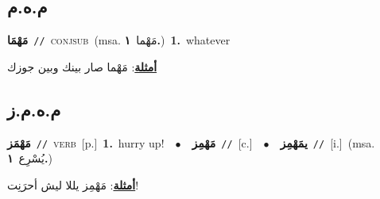 \documentclass[10pt,a4paper,twoside]{article} %
\begin{document}
\begin{multicols}{2}
\vspace{-3mm}
\subsection*{\color{blue}\foreignlanguage{arabic}{م.ه.م}\color{blue}{}} 

{\setlength\topsep{0pt}\textbf{\foreignlanguage{arabic}{مَهْمَا}}\ {\color{gray}\texttt{//}\color{black}}\ \textsc{conj\textunderscore sub}\ \color{gray}(msa. \foreignlanguage{arabic}{مَهْما}~\foreignlanguage{arabic}{\textbf{١.}})\color{black}\ \textbf{1.}~whatever\  \begin{flushright}\color{gray}\foreignlanguage{arabic}{\textbf{\underline{\foreignlanguage{arabic}{أمثلة}}}: مَهْما صار بينك وبين جوزك}\end{flushright}\color{black}} \vspace{2mm}

\vspace{-3mm}
\subsection*{\color{blue}\foreignlanguage{arabic}{م.ه.م.ز}\color{blue}{}} 

{\setlength\topsep{0pt}\textbf{\foreignlanguage{arabic}{مَهْمَز}}\ {\color{gray}\texttt{//}\color{black}}\ \textsc{verb}\ [p.]\ \textbf{1.}~hurry up!\ \ $\bullet$\ \ \setlength\topsep{0pt}\textbf{\foreignlanguage{arabic}{مَهْمِز}}\ {\color{gray}\texttt{//}\color{black}}\ [c.]\ \ $\bullet$\ \ \setlength\topsep{0pt}\textbf{\foreignlanguage{arabic}{يمَهْمِز}}\ {\color{gray}\texttt{//}\color{black}}\ [i.]\ \color{gray}(msa. \foreignlanguage{arabic}{يُسْرِع}~\foreignlanguage{arabic}{\textbf{١.}})\color{black}\  \begin{flushright}\color{gray}\foreignlanguage{arabic}{\textbf{\underline{\foreignlanguage{arabic}{أمثلة}}}: مَهْمِز يللا ليش أحرَنِت!}\end{flushright}\color{black}} \vspace{2mm}


\end{multicols}
\end{document}

